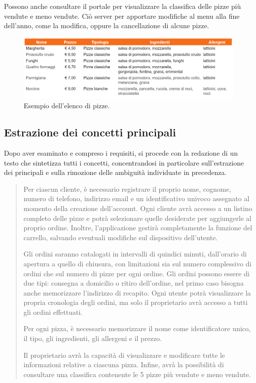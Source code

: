 \documentclass[a4paper,12pt, oneside]{article}
\begin{document}
Possono anche consultare il portale per visualizzare la classifica delle
pizze più vendute e meno vendute. Ciò server per apportare modifiche
al menu alla fine dell'anno, come la modifica, oppure la cancellazione
di alcune pizze.

\newpage
\begin{figure}[h]
    \centering
    \includegraphics[width=1\textwidth]{esempio_pizze.png}
    \caption{Esempio dell'elenco di pizze.}
    \label{fig:esempio_pizze}
\end{figure}

\subsection{Estrazione dei concetti principali}

Dopo aver esaminato e compreso i requisiti, si procede con la redazione
di un testo che sintetizza tutti i concetti, concentrandosi in
particolare sull'estrazione dei principali e sulla rimozione delle
ambiguità individuate in precedenza.
\begin{quote}

Per ciascun cliente, è necessario registrare il proprio nome, cognome,
numero di telefono, indirizzo email e un identificativo univoco assegnato
al momento della creazione dell'account. Ogni cliente avrà accesso a un
listino completo delle pizze e potrà selezionare quelle desiderate per
aggiungerle al proprio ordine. Inoltre, l'applicazione gestirà
completamente la funzione del carrello, salvando eventuali modifiche
sul dispositivo dell'utente.

Gli ordini saranno catalogati in intervalli di quindici minuti,
dall'orario di apertura a quello di chiusura, con limitazioni sia
sul numero complessivo di ordini che sul numero di pizze per ogni
ordine. Gli ordini possono essere di due tipi: consegna a domicilio o
ritiro dell'ordine, nel primo caso bisogna anche memorizzare l'indirizzo
di recapito. Ogni utente potrà visualizzare la propria cronologia degli
ordini, ma solo il proprietario avrà accesso a tutti gli ordini
effettuati.

Per ogni pizza, è necessario memorizzare il nome come identificatore
unico, il tipo, gli ingredienti, gli allergeni e il prezzo.

Il proprietario avrà la capacità di visualizzare e modificare tutte
le informazioni relative a ciascuna pizza. Infine, avrà la possibilità
di consultare una classifica contenente le 5 pizze più vendute e meno
vendute.
\end{quote}
\end{document}
